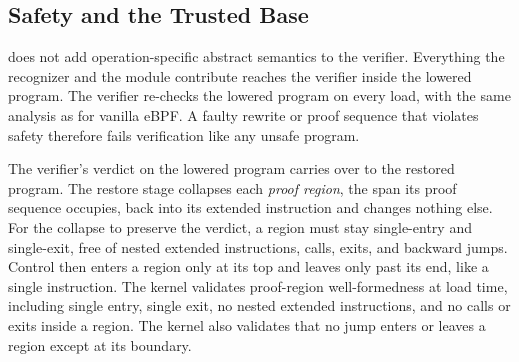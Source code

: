 \subsection{Safety and the Trusted Base}
\label{subsec:safety}

\tool does not add operation-specific abstract semantics to the verifier.
Everything the recognizer and the module contribute reaches the verifier inside the lowered program.
The verifier re-checks the lowered program on every load, with the same analysis as for vanilla eBPF.
A faulty rewrite or proof sequence that violates safety therefore fails verification like any unsafe program.

The verifier's verdict on the lowered program carries over to the restored program.
The restore stage collapses each \emph{proof region}, the span its proof sequence occupies, back into its extended instruction and changes nothing else.
For the collapse to preserve the verdict, a region must stay single-entry and single-exit, free of nested extended instructions, calls, exits, and backward jumps.
Control then enters a region only at its top and leaves only past its end, like a single instruction.
The kernel validates proof-region well-formedness at load time, including single entry, single exit, no nested extended instructions, and no calls or exits inside a region.
The kernel also validates that no jump enters or leaves a region except at its boundary.

